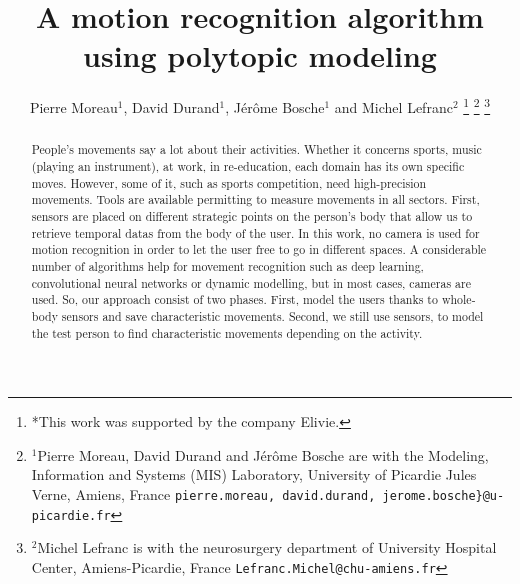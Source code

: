 \documentclass[letterpaper, 10 pt, conference]{ieeeconf}  %
\title{\LARGE \bf
A motion recognition algorithm using polytopic modeling
}
\author{Pierre Moreau$^{1}$, David Durand$^{1}$, J\'er\^ome Bosche$^{1}$ and Michel Lefranc$^{2}$%
\thanks{*This work was supported by the company Elivie.}%
\thanks{$^{1}$Pierre Moreau, David Durand and J\'er\^ome Bosche are with the Modeling, Information and Systems (MIS) Laboratory, University of Picardie Jules Verne, Amiens, France
        {\tt\small pierre.moreau, david.durand, jerome.bosche\}@u-picardie.fr}}%
\thanks{$^{2}$Michel Lefranc is with the neurosurgery department of
University Hospital Center, Amiens-Picardie, France
        {\tt\small Lefranc.Michel@chu-amiens.fr}}%
}
\begin{document}
\maketitle
\thispagestyle{empty}
\pagestyle{empty}


\begin{abstract}

People's movements say a lot about their activities. Whether it concerns sports, music (playing an instrument), at work, in re-education, each domain has its own specific moves. However, some of it, such as sports competition, need high-precision movements. Tools are available permitting to measure movements in all sectors. First, sensors are placed on different strategic points on the person's body that allow us to retrieve temporal datas from the body of the user. In this work, no camera is used for motion recognition in order to let the user free to go in different spaces. A considerable number of algorithms help for movement recognition such as deep learning, convolutional neural networks or dynamic modelling, but in most cases, cameras are used. So, our approach consist of two phases. First, model the users thanks to whole-body sensors and save characteristic movements. Second, we still use sensors, to model the test person to find characteristic movements depending on the activity.



\end{abstract}


\end{document}
